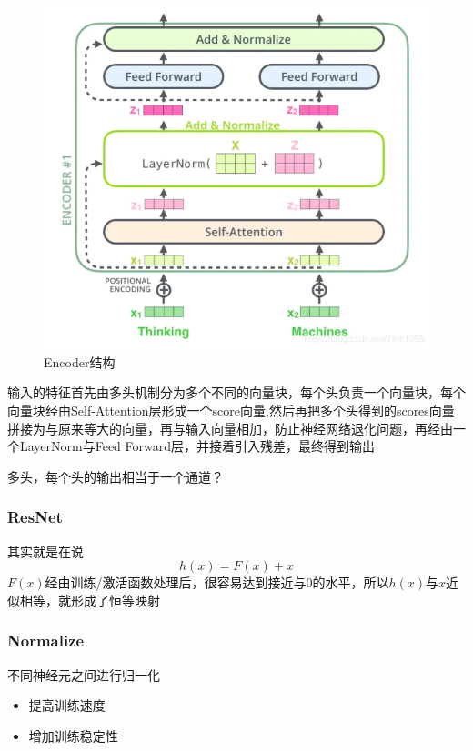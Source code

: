 \documentclass[a4paper]{article}
\begin{document}
\begin{sloppypar}
      \begin{figure}[ht]
            \centering
            \label{enc}
            \includegraphics[scale=0.5]{enc}
            \caption{Encoder结构}
      \end{figure}
      输入的特征首先由多头机制分为多个不同的向量块，每个头负责一个向量块，每个向量块经由Self-Attention层形成一个score向量,然后再把多个头得到的scores向量拼接为与原来等大的向量，再与输入向量相加，防止神经网络退化问题，再经由一个LayerNorm与Feed Forward层，并接着引入残差，最终得到输出

      多头，每个头的输出相当于一个通道？

      \subsubsection{ResNet}

      其实就是在说
      $$
            h(x)=F(x)+x
      $$
      $F(x)$经由训练/激活函数处理后，很容易达到接近与0的水平，所以$h(x)$与$x$近似相等，就形成了恒等映射

      \subsubsection{Normalize}

      不同神经元之间进行归一化
      \begin{itemize}
            \item 提高训练速度
            \item 增加训练稳定性
      \end{itemize}



\end{sloppypar}
\end{document}

